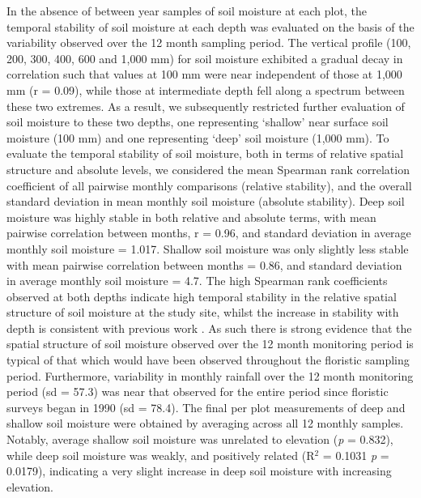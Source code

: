 In the absence of between year samples of soil moisture at each plot, the temporal stability of soil moisture at each depth was evaluated on the basis of the variability observed over the 12 month sampling period. 
The vertical profile (100, 200, 300, 400, 600 and 1,000 mm) for soil moisture exhibited a gradual decay in correlation such that values at 100 mm were near independent of those at 1,000 mm (r = 0.09), while those at intermediate depth fell along a spectrum between these two extremes. As a result, we subsequently restricted further evaluation of soil moisture to these two depths, one representing `shallow' near surface soil moisture (100 mm) and one representing `deep' soil moisture (1,000 mm). To evaluate the temporal stability of soil moisture, both in terms of relative spatial structure and absolute levels, we considered the mean Spearman rank correlation coefficient of all pairwise monthly comparisons (relative stability), and the overall standard deviation in mean monthly soil moisture (absolute stability). Deep soil moisture was highly stable in both relative and absolute terms, with mean pairwise correlation between months, r = 0.96, and standard deviation in average monthly soil moisture = 1.017. Shallow soil moisture was only slightly less stable with mean pairwise correlation between months = 0.86, and standard deviation in average monthly soil moisture = 4.7. The high Spearman rank coefficients observed at both depths indicate high temporal stability in the relative spatial structure of soil moisture at the study site, whilst the increase in stability with depth is consistent with previous work \citep{Cassel2000}. As such there is strong evidence that the spatial structure of soil moisture observed over the 12 month monitoring period is typical of that which would have been observed throughout the floristic sampling period. %
Furthermore, variability in monthly rainfall over the 12 month monitoring period (sd = 57.3) was near that observed for the entire period since floristic surveys began in 1990 (sd = 78.4). The final per plot measurements of deep and shallow soil moisture were obtained by averaging across all 12 monthly samples. Notably, average shallow soil moisture was unrelated to elevation (\textit{p} = 0.832), while deep soil moisture was weakly, and positively related (R$^2$ = 0.1031 \textit{p} = 0.0179), indicating a very slight increase in deep soil moisture with increasing elevation. 

